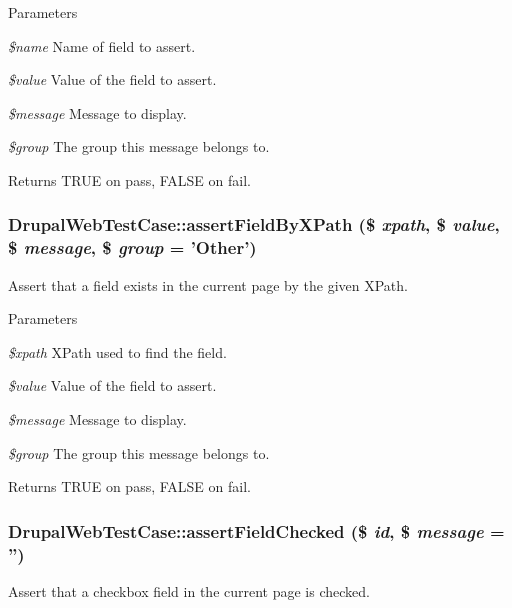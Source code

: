 \begin{DoxyParams}{Parameters}
\item[{\em \$name}]Name of field to assert. \item[{\em \$value}]Value of the field to assert. \item[{\em \$message}]Message to display. \item[{\em \$group}]The group this message belongs to. \end{DoxyParams}
\begin{DoxyReturn}{Returns}
TRUE on pass, FALSE on fail. 
\end{DoxyReturn}
\hypertarget{class_drupal_web_test_case_af7479a905b9933e14dcfb5585b03361f}{
\subsubsection[{assertFieldByXPath}]{\setlength{\rightskip}{0pt plus 5cm}DrupalWebTestCase::assertFieldByXPath (\$ {\em xpath}, \/  \$ {\em value}, \/  \$ {\em message}, \/  \$ {\em group} = {\ttfamily 'Other'})}}
\label{class_drupal_web_test_case_af7479a905b9933e14dcfb5585b03361f}
Assert that a field exists in the current page by the given XPath.


\begin{DoxyParams}{Parameters}
\item[{\em \$xpath}]XPath used to find the field. \item[{\em \$value}]Value of the field to assert. \item[{\em \$message}]Message to display. \item[{\em \$group}]The group this message belongs to. \end{DoxyParams}
\begin{DoxyReturn}{Returns}
TRUE on pass, FALSE on fail. 
\end{DoxyReturn}
\hypertarget{class_drupal_web_test_case_aea0ec61d9b9f476c5b23cb0111bda4b7}{
\subsubsection[{assertFieldChecked}]{\setlength{\rightskip}{0pt plus 5cm}DrupalWebTestCase::assertFieldChecked (\$ {\em id}, \/  \$ {\em message} = {\ttfamily ''})}}
\label{class_drupal_web_test_case_aea0ec61d9b9f476c5b23cb0111bda4b7}
Assert that a checkbox field in the current page is checked.


